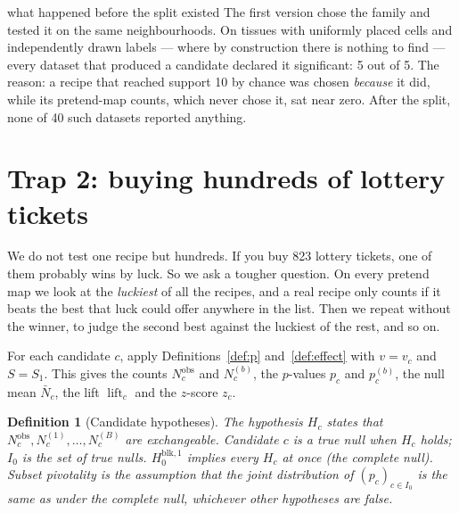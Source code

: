 \documentclass[11pt,a4paper]{article}
\newtheorem{definition}{Definition}[section]
\theoremstyle{remark}
\newcommand{\obs}{\mathrm{obs}}
\newcommand{\lift}{\operatorname{lift}}
\begin{document}
\begin{example}{what happened before the split existed}
The first version chose the family and tested it on the same neighbourhoods.
On tissues with uniformly placed cells and independently drawn labels ---
where by construction there is nothing to find --- every dataset that produced
a candidate declared it significant: 5 out of 5. The reason: a recipe that
reached support 10 by chance was chosen \emph{because} it did, while its
pretend-map counts, which never chose it, sat near zero. After the split, none
of 40 such datasets reported anything.
\end{example}

\section{Trap 2: buying hundreds of lottery tickets}
\label{sec:wy}

\begin{plain}
We do not test one recipe but hundreds. If you buy 823 lottery tickets, one of
them probably wins by luck. So we ask a tougher question. On every pretend map
we look at the \emph{luckiest} of all the recipes, and a real recipe only
counts if it beats the best that luck could offer anywhere in the list. Then we
repeat without the winner, to judge the second best against the luckiest of
the rest, and so on.
\end{plain}

For each candidate $c$, apply Definitions~\ref{def:p} and~\ref{def:effect}
with $v=v_c$ and $S=S_1$. This gives the counts $N^{\obs}_c$ and $N^{(b)}_c$,
the $p$-values $p_c$ and $p^{(b)}_c$, the null mean $\bar N_c$, the lift
$\lift_c$ and the $z$-score $z_c$.

\begin{definition}[Candidate hypotheses]
\label{def:hyp}
The hypothesis $H_c$ states that $N^{\obs}_c,N^{(1)}_c,\dots,N^{(B)}_c$ are
exchangeable. Candidate $c$ is a \emph{true null} when $H_c$ holds; $I_0$ is
the set of true nulls. $H_0^{\mathrm{blk},1}$ implies every $H_c$ at once (the
\emph{complete null}). \emph{Subset pivotality} is the assumption that the
joint distribution of $(p_c)_{c\in I_0}$ is the same as under the complete
null, whichever other hypotheses are false.
\end{definition}
\end{document}
